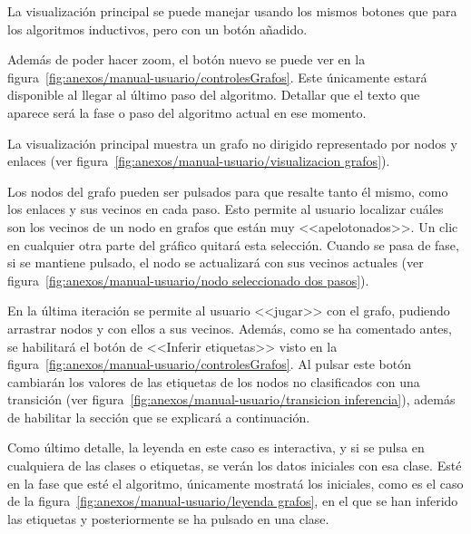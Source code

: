 
La visualización principal se puede manejar usando los mismos botones que para los algoritmos inductivos, pero con un botón añadido.


Además de poder hacer zoom, el botón nuevo se puede ver en la figura~\ref{fig:anexos/manual-usuario/controlesGrafos}. Este únicamente estará disponible al llegar al último paso del algoritmo. Detallar que el texto que aparece será la fase o paso del algoritmo actual en ese momento.

La visualización principal muestra un grafo no dirigido representado por nodos y enlaces (ver figura~\ref{fig:anexos/manual-usuario/visualizacion grafos}).

Los nodos del grafo pueden ser pulsados para que resalte tanto él mismo, como los enlaces y sus vecinos en cada paso. Esto permite al usuario localizar cuáles son los vecinos de un nodo en grafos que están muy <<apelotonados>>. Un clic en cualquier otra parte del gráfico quitará esta selección. Cuando se pasa de fase, si se mantiene pulsado, el nodo se actualizará con sus vecinos actuales (ver figura~\ref{fig:anexos/manual-usuario/nodo seleccionado dos pasos}).


En la última iteración se permite al usuario <<jugar>> con el grafo, pudiendo arrastrar nodos y con ellos a sus vecinos. Además, como se ha comentado antes, se habilitará el botón de <<Inferir etiquetas>> visto en la figura~\ref{fig:anexos/manual-usuario/controlesGrafos}. Al pulsar este botón cambiarán los valores de las etiquetas de los nodos no clasificados con una transición (ver figura~\ref{fig:anexos/manual-usuario/transicion inferencia}), además de habilitar la sección que se explicará a continuación.


Como último detalle, la leyenda en este caso es interactiva, y si se pulsa en cualquiera de las clases o etiquetas, se verán los datos iniciales con esa clase. Esté en la fase que esté el algoritmo, únicamente mostratá los iniciales, como es el caso de la figura~\ref{fig:anexos/manual-usuario/leyenda grafos}, en el que se han inferido las etiquetas y posteriormente se ha pulsado en una clase.


